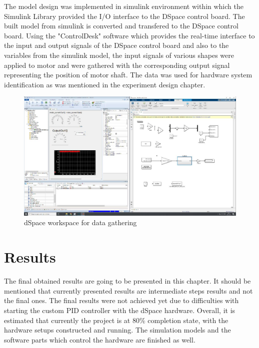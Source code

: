 \documentclass[]{final_report}
\begin{document}
The model design was implemented in simulink environment within which the Simulink Library provided the I/O interface to the DSpace control board. The built model from simulink is converted and transfered to the DSpace control board. Using the "ControlDesk" software which provides the real-time interface to the input and output signals of the DSpace control board and also to the variables from the simulink model, the input signals of various shapes were applied to motor and were gathered with the corresponding output signal representing the position of motor shaft. The data was used for hardware system identification as was mentioned in the experiment design chapter.

\begin{figure} [h!]
\centerline{\includegraphics[width=.75\textwidth]{Screenshots for paper/dSpace/photo_2021-03-09 11.37.29.jpeg}}
\caption{dSpace workspace for data gathering}
\label{fig:dSpaceEx1}
\end{figure}


\chapter{Results}
The final obtained results are going to be presented in this chapter. It should be mentioned that currently presented results are intermediate steps results and not the final ones. The final results were not achieved yet due to difficulties with starting the custom PID controller with the dSpace hardware. Overall, it is estimated that currently the project is at 80\% completion state, with the hardware setups constructed and running. The simulation models and the software parts which control the hardware are finished as well. 
\end{document}
